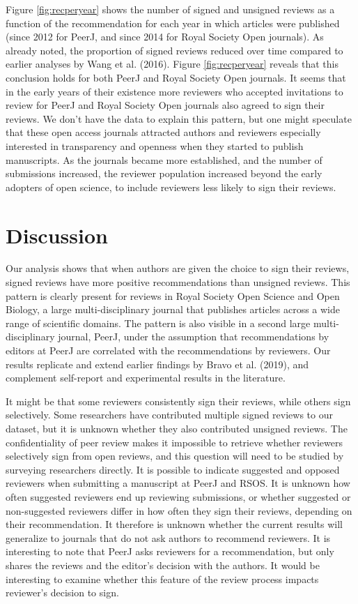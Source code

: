 \documentclass[
  english,
  ,jou, a4paper,floatsintext]{apa6}
\begin{document}
Figure \ref{fig:recperyear} shows the number of signed and unsigned reviews as a function of the recommendation for each year in which articles were published (since 2012 for PeerJ, and since 2014 for Royal Society Open journals). As already noted, the proportion of signed reviews reduced over time compared to earlier analyses by Wang et al. (2016). Figure \ref{fig:recperyear} reveals that this conclusion holds for both PeerJ and Royal Society Open journals. It seems that in the early years of their existence more reviewers who accepted invitations to review for PeerJ and Royal Society Open journals also agreed to sign their reviews. We don't have the data to explain this pattern, but one might speculate that these open access journals attracted authors and reviewers especially interested in transparency and openness when they started to publish manuscripts. As the journals became more established, and the number of submissions increased, the reviewer population increased beyond the early adopters of open science, to include reviewers less likely to sign their reviews.

\hypertarget{discussion}{%
\section{Discussion}\label{discussion}}

Our analysis shows that when authors are given the choice to sign their reviews, signed reviews have more positive recommendations than unsigned reviews. This pattern is clearly present for reviews in Royal Society Open Science and Open Biology, a large multi-disciplinary journal that publishes articles across a wide range of scientific domains. The pattern is also visible in a second large multi-disciplinary journal, PeerJ, under the assumption that recommendations by editors at PeerJ are correlated with the recommendations by reviewers. Our results replicate and extend earlier findings by Bravo et al. (2019), and complement self-report and experimental results in the literature.

It might be that some reviewers consistently sign their reviews, while others sign selectively. Some researchers have contributed multiple signed reviews to our dataset, but it is unknown whether they also contributed unsigned reviews. The confidentiality of peer review makes it impossible to retrieve whether reviewers selectively sign from open reviews, and this question will need to be studied by surveying researchers directly. It is possible to indicate suggested and opposed reviewers when submitting a manuscript at PeerJ and RSOS. It is unknown how often suggested reviewers end up reviewing submissions, or whether suggested or non-suggested reviewers differ in how often they sign their reviews, depending on their recommendation. It therefore is unknown whether the current results will generalize to journals that do not ask authors to recommend reviewers. It is interesting to note that PeerJ asks reviewers for a recommendation, but only shares the reviews and the editor's decision with the authors. It would be interesting to examine whether this feature of the review process impacts reviewer's decision to sign.
\end{document}
